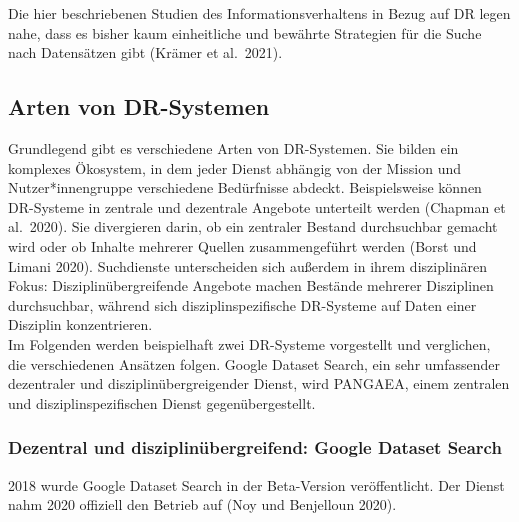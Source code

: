\documentclass[a4paper,
fontsize=11pt,
oneside,
numbers=noperiodatend,
parskip=half-,
bibliography=totoc,
final
]{scrartcl}
\begin{document}
Die hier beschriebenen Studien des Informationsverhaltens in Bezug auf
DR legen nahe, dass es bisher kaum einheitliche und bewährte Strategien
für die Suche nach Datensätzen gibt (Krämer et al.~2021).

\hypertarget{arten-von-dr-systemen}{%
\subsection{Arten von DR-Systemen}\label{arten-von-dr-systemen}}

Grundlegend gibt es verschiedene Arten von DR-Systemen. Sie bilden ein
komplexes Ökosystem, in dem jeder Dienst abhängig von der Mission und
Nutzer*innengruppe verschiedene Bedürfnisse abdeckt. Beispielsweise
können DR-Systeme in zentrale und dezentrale Angebote unterteilt werden
(Chapman et al.~2020). Sie divergieren darin, ob ein zentraler Bestand
durchsuchbar gemacht wird oder ob Inhalte mehrerer Quellen
zusammengeführt werden (Borst und Limani 2020). Suchdienste
unterscheiden sich außerdem in ihrem disziplinären Fokus:
Disziplinübergreifende Angebote machen Bestände mehrerer Disziplinen
durchsuchbar, während sich disziplinspezifische DR-Systeme auf Daten
einer Disziplin konzentrieren.\\
Im Folgenden werden beispielhaft zwei DR-Systeme vorgestellt und
verglichen, die verschiedenen Ansätzen folgen. Google Dataset Search,
ein sehr umfassender dezentraler und disziplinübergreigender Dienst,
wird PANGAEA, einem zentralen und disziplinspezifischen Dienst
gegenübergestellt.

\hypertarget{dezentral-und-disziplinuxfcbergreifend-google-dataset-search}{%
\subsubsection{Dezentral und disziplinübergreifend: Google Dataset
Search}\label{dezentral-und-disziplinuxfcbergreifend-google-dataset-search}}

2018 wurde Google Dataset Search in der Beta-Version veröffentlicht. Der
Dienst nahm 2020 offiziell den Betrieb auf (Noy und Benjelloun 2020).
\end{document}
